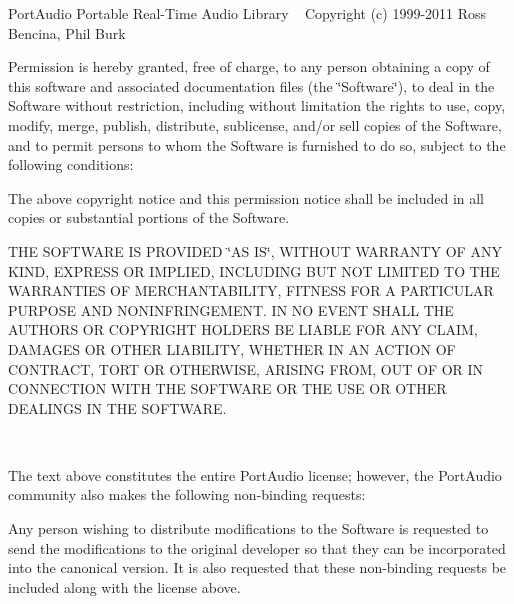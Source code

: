 Port\+Audio Portable Real-\/\+Time Audio Library ~\newline
 Copyright (c) 1999-\/2011 Ross Bencina, Phil Burk

Permission is hereby granted, free of charge, to any person obtaining a copy of this software and associated documentation files (the \char`\"{}\+Software\char`\"{}), to deal in the Software without restriction, including without limitation the rights to use, copy, modify, merge, publish, distribute, sublicense, and/or sell copies of the Software, and to permit persons to whom the Software is furnished to do so, subject to the following conditions\+:

The above copyright notice and this permission notice shall be included in all copies or substantial portions of the Software.

THE SOFTWARE IS PROVIDED \char`\"{}\+AS IS\char`\"{}, WITHOUT WARRANTY OF ANY KIND, EXPRESS OR IMPLIED, INCLUDING BUT NOT LIMITED TO THE WARRANTIES OF MERCHANTABILITY, FITNESS FOR A PARTICULAR PURPOSE AND NONINFRINGEMENT. IN NO EVENT SHALL THE AUTHORS OR COPYRIGHT HOLDERS BE LIABLE FOR ANY CLAIM, DAMAGES OR OTHER LIABILITY, WHETHER IN AN ACTION OF CONTRACT, TORT OR OTHERWISE, ARISING FROM, OUT OF OR IN CONNECTION WITH THE SOFTWARE OR THE USE OR OTHER DEALINGS IN THE SOFTWARE.

~\newline


The text above constitutes the entire Port\+Audio license; however, the Port\+Audio community also makes the following non-\/binding requests\+:

Any person wishing to distribute modifications to the Software is requested to send the modifications to the original developer so that they can be incorporated into the canonical version. It is also requested that these non-\/binding requests be included along with the license above. 